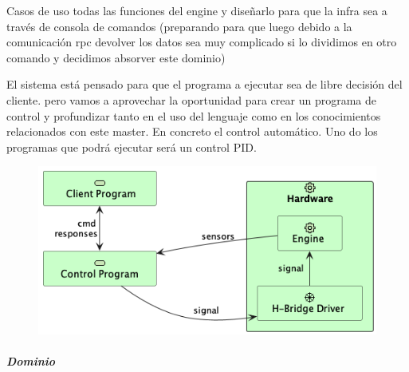 Casos de uso todas las funciones del engine y diseñarlo para que la infra sea a través de consola de comandos (preparando para que luego debido a la comunicación rpc devolver los datos sea muy complicado si lo dividimos en otro comando y decidimos absorver este dominio)

El sistema está pensado para que el programa a ejecutar sea de libre decisión del cliente. pero vamos a aprovechar la oportunidad para crear un programa de control y profundizar tanto en el uso del lenguaje como en los conocimientos relacionados con este master. En concreto el control automático. Uno do los programas que podrá ejecutar será un control PID.



\begin{figure}[H]
    \centering
    \includegraphics[height=0.3\textheight]{./part/Proyecto_ejecutivo/memoria_descriptiva/descripcionDelProyecto/control/uml/controlConcept}
    \caption[Diagrama componentes]{}\label{fig:controlConcept}
\end{figure}

\subparagraph{Dominio}

